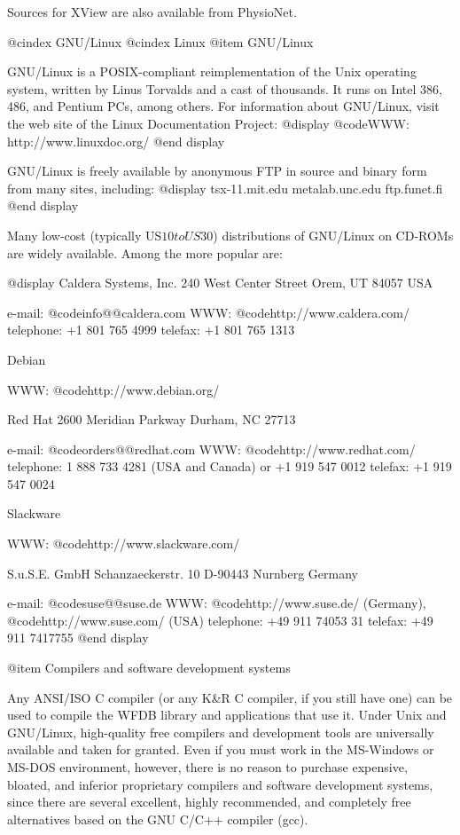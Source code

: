 {{{{{{{{{Sources for XView are also available from PhysioNet.

@cindex GNU/Linux
@cindex Linux
@item GNU/Linux

GNU/Linux is a POSIX-compliant reimplementation of the Unix operating system,
written by Linus Torvalds and a cast of thousands.  It runs on Intel 386,
486, and Pentium PCs, among others.  For information about GNU/Linux, visit
the web site of the Linux Documentation Project:
@display
@code{WWW: http://www.linuxdoc.org/}
@end display

GNU/Linux is freely available by anonymous FTP in source and binary form from
many sites, including:
@display
tsx-11.mit.edu
metalab.unc.edu
ftp.funet.fi
@end display

Many low-cost (typically US$10 to US$30) distributions of GNU/Linux on CD-ROMs
are widely available.  Among the more popular are:

@display
Caldera Systems, Inc.
240 West Center Street
Orem, UT 84057 USA

e-mail: @code{info@@caldera.com}
WWW: @code{http://www.caldera.com/}
telephone: +1 801 765 4999
telefax: +1 801 765 1313


Debian

WWW: @code{http://www.debian.org/}


Red Hat
2600 Meridian Parkway
Durham, NC 27713

e-mail: @code{orders@@redhat.com}
WWW: @code{http://www.redhat.com/}
telephone: 1 888 733 4281 (USA and Canada) or +1 919 547 0012
telefax: +1 919 547 0024


Slackware

WWW: @code{http://www.slackware.com/}


S.u.S.E. GmbH
Schanzaeckerstr. 10
D-90443 Nurnberg
Germany

e-mail: @code{suse@@suse.de}
WWW: @code{http://www.suse.de/} (Germany), @code{http://www.suse.com/} (USA)
telephone: +49 911 74053 31
telefax: +49 911 7417755
@end display

@item Compilers and software development systems

Any ANSI/ISO C compiler (or any K&R C compiler, if you still have one)
can be used to compile the WFDB library and applications that use it.
Under Unix and GNU/Linux, high-quality free compilers and development
tools are universally available and taken for granted.  Even if you must
work in the MS-Windows or MS-DOS environment, however, there is no
reason to purchase expensive, bloated, and inferior proprietary
compilers and software development systems, since there are several
excellent, highly recommended, and completely free alternatives based
on the GNU C/C++ compiler (gcc).

}}}}}}}}}
